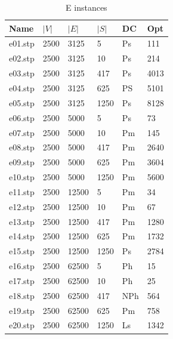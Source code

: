 \begin{table}[H]
\label{my-label}
\begin{center}
\begin{tabular}{|l|l|l|l|l|l|}
\hline
Name & $|V|$      & $|E|$      & $|S|$      & DC         & Opt       \\ \hline

 e01.stp &  2500      &  3125      &   5    & Ps   & 111    \\ \hline
 e02.stp &  2500      &  3125      &  10    & Ps   & 214     \\ \hline
 e03.stp &  2500      &  3125      &  417   & Ps   & 4013    \\ \hline
 e04.stp &  2500      &  3125      &  625   & PS   & 5101    \\ \hline
 e05.stp &  2500      &  3125      &  1250  & Ps   & 8128     \\ \hline
 e06.stp &  2500      &  5000      &  5     & Ps   & 73     \\ \hline
 e07.stp &  2500      &  5000      &  10    & Pm   & 145      \\ \hline
 e08.stp &  2500      &  5000      &  417   & Pm   & 2640       \\ \hline
 e09.stp &  2500      &  5000      &  625   & Pm   & 3604            \\ \hline
 e10.stp &  2500      &  5000      &  1250  & Pm   & 5600      \\ \hline
 e11.stp &  2500      &  12500     &  5     & Pm   & 34         \\ \hline
 e12.stp &  2500      &  12500     &  10    & Pm   & 67        \\ \hline
 e13.stp &  2500      &  12500     &  417   & Pm   & 1280          \\ \hline
 e14.stp &  2500      &  12500     &  625   & Pm   & 1732            \\ \hline
 e15.stp &  2500      &  12500     &  1250  & Ps   & 2784        \\ \hline
 e16.stp &  2500      &  62500     &  5     & Ph   & 15       \\ \hline
 e17.stp &  2500      &  62500     &  10    & Ph   & 25       \\ \hline
 e18.stp &  2500      &  62500     &  417   & NPh  & 564       \\ \hline
 e19.stp &  2500      &  62500     &  625   & Pm   & 758    \\ \hline
 e20.stp &  2500      &  62500     &  1250  & Ls   & 1342     \\ \hline
 
\end{tabular}
\end{center}
\caption{E instances}
\end{table}


